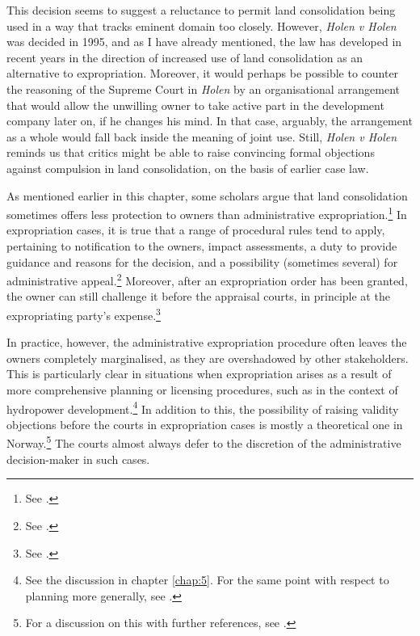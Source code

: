 This decision seems to suggest a reluctance to permit land consolidation being used in a way that tracks eminent domain too closely. However, {\it Holen v Holen} was decided in 1995, and as I have already mentioned, the law has developed in recent years in the direction of increased use of land consolidation as an alternative to expropriation. Moreover, it would perhaps be possible to counter the reasoning of the Supreme Court in {\it Holen} by an organisational arrangement that would allow the unwilling owner to take active part in the development company later on, if he changes his mind. In that case, arguably, the arrangement as a whole would fall back inside the meaning of joint use. Still, {\it Holen v Holen} reminds us that critics might be able to raise convincing formal objections against compulsion in land consolidation, on the basis of earlier case law. 

As mentioned earlier in this chapter, some scholars argue that land consolidation sometimes offers less protection to owners than administrative expropriation.\footnote{See \cite[318-319]{stenseth07}.} In expropriation cases, it is true that a range of procedural rules tend to apply, pertaining to notification to the owners, impact assessments, a duty to provide guidance and reasons for the decision, and a possibility (sometimes several) for administrative appeal.\footnote{See \cite[377-382]{dyrkolbotn15b}.} Moreover, after an expropriation order has been granted, the owner can still challenge it before the appraisal courts, in principle at the expropriating party's expense.\footnote{See \cite[382-384]{dyrkolbotn15b}.}

In practice, however, the administrative expropriation procedure often leaves the owners completely marginalised, as they are overshadowed by other stakeholders. This is particularly clear in situations when expropriation arises as a result of more comprehensive planning or licensing procedures, such as in the context of hydropower development.\footnote{See the discussion in chapter \ref{chap:5}. For the same point with respect to planning more generally, see \cite[376]{dyrkolbotn15b}.} In addition to this, the possibility of raising validity objections before the courts in expropriation cases is mostly a theoretical one in Norway.\footnote{For a discussion on this with further references, see \cite[384-386]{dyrkolbotn15b}.} The courts almost always defer to the discretion of the administrative decision-maker in such cases.

